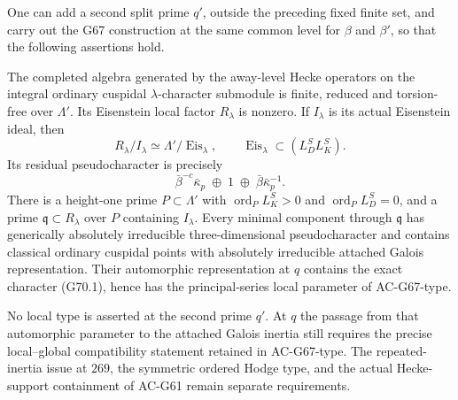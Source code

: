 \begin{proposition}
\label{AC-G70}
One can add a second split prime $q'$, outside the preceding
fixed finite set, and carry out the G67 construction at the
same common level for $\beta$ and $\beta'$, so that the
following assertions hold.

The completed algebra generated by the away-level Hecke
operators on the integral ordinary cuspidal
$\lambda$-character submodule is finite, reduced and
torsion-free over $\Lambda'$.  Its Eisenstein local factor
$R_\lambda$ is nonzero.  If $I_\lambda$ is its actual
Eisenstein ideal, then
\[
 R_\lambda/I_\lambda\simeq\Lambda'/\operatorname{Eis}_\lambda,
 \qquad
 \operatorname{Eis}_\lambda\subset(L_D^S L_K^S).
                                                        \tag{G70.2}
\]
Its residual pseudocharacter is precisely
\[
           \bar\beta^{-c}\bar\kappa_p\;\oplus\;1
                        \;\oplus\;\bar\beta\bar\kappa_p^{-1}.
                                                        \tag{G70.3}
\]
There is a height-one prime $P\subset\Lambda'$ with
$\operatorname{ord}_P L_K^S>0$ and
$\operatorname{ord}_P L_D^S=0$, and a prime
$\mathfrak q\subset R_\lambda$ over $P$ containing
$I_\lambda$.  Every minimal component through
$\mathfrak q$ has generically absolutely irreducible
three-dimensional pseudocharacter and contains classical
ordinary cuspidal points with absolutely irreducible attached
Galois representation.  Their automorphic representation at
$q$ contains the exact character (G70.1), hence has the
principal-series local parameter of AC-G67-type.

No local type is asserted at the second prime $q'$.
At $q$ the passage from that automorphic parameter to the
attached Galois inertia still requires the precise local--global
compatibility statement retained in AC-G67-type.
The repeated-inertia issue at $269$, the symmetric ordered
Hodge type, and the actual Hecke-support containment of
AC-G61 remain separate requirements.
\end{proposition}
